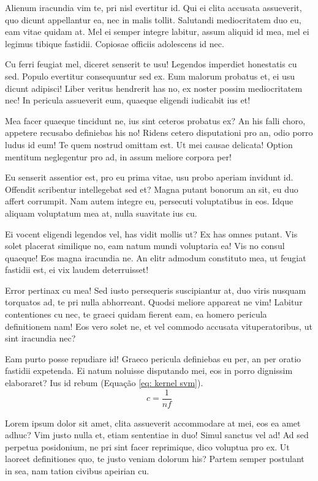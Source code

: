 \documentclass[
	12pt,				%
	openright,			%
	oneside,			%
	a4paper,			%
	english,			%
	french,				%
	spanish,			%
	brazil,				%
	]{abntex2}
\begin{document}
Alienum iracundia vim te, pri nisl evertitur id. Qui ei clita accusata assueverit, quo dicunt appellantur ea, nec in malis tollit. Salutandi mediocritatem duo eu, eam vitae quidam at. Mel ei semper integre labitur, assum aliquid id mea, mel ei legimus tibique fastidii. Copiosae officiis adolescens id nec.

Cu ferri feugiat mel, diceret senserit te usu! Legendos imperdiet honestatis cu sed. Populo evertitur consequuntur sed ex. Eum malorum probatus et, ei usu dicunt adipisci! Liber veritus hendrerit has no, ex noster possim mediocritatem nec! In pericula assueverit eum, quaeque eligendi iudicabit ius et!

Mea facer quaeque tincidunt ne, ius sint ceteros probatus ex? An his falli choro, appetere recusabo definiebas his no! Ridens cetero disputationi pro an, odio porro ludus id eum! Te quem nostrud omittam est. Ut mei causae delicata! Option mentitum neglegentur pro ad, in assum meliore corpora per!

Eu senserit assentior est, pro eu prima vitae, usu probo aperiam invidunt id. Offendit scribentur intellegebat sed et? Magna putant bonorum an sit, eu duo affert corrumpit. Nam autem integre eu, persecuti voluptatibus in eos. Idque aliquam voluptatum mea at, nulla suavitate ius cu.

Ei vocent eligendi legendos vel, has vidit mollis ut? Ex has omnes putant. Vis solet placerat similique no, eam natum mundi voluptaria ea! Vis no consul quaeque! Eos magna iracundia ne. An elitr admodum constituto mea, ut feugiat fastidii est, ei vix laudem deterruisset!

Error pertinax cu mea! Sed iusto persequeris suscipiantur at, duo viris nusquam torquatos ad, te pri nulla abhorreant. Quodsi meliore appareat ne vim! Labitur contentiones cu nec, te graeci quidam fierent eam, ea homero pericula definitionem nam! Eos vero solet ne, et vel commodo accusata vituperatoribus, ut sint iracundia nec?

Eam purto posse repudiare id! Graeco pericula definiebas eu per, an per oratio fastidii expetenda. Ei natum noluisse disputando mei, eos in porro dignissim elaboraret? Ius id rebum (Equação \ref{eq: kernel svm}).
\begin{equation}
\label{eq: kernel svm}
    c = \frac {1} {\textit{nf}}
\end{equation}

Lorem ipsum dolor sit amet, clita assueverit accommodare at mei, eos ea amet adhuc? Vim justo nulla et, etiam sententiae in duo! Simul sanctus vel ad! Ad sed perpetua posidonium, ne pri sint facer reprimique, dico voluptua pro ex. Ut laoreet definitiones quo, te justo veniam dolorum his? Partem semper postulant in sea, nam tation civibus apeirian cu.
\end{document}
